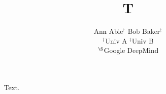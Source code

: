 \documentclass{article}
\title{T}
\author{Ann Able$^{\dagger}$ \quad Bob Baker$^{\ddagger}$ \\ $^\dagger$Univ A \quad $^\ddagger$Univ B \\ $^\S$Google DeepMind}
\begin{document}
\maketitle
Text.
\end{document}
